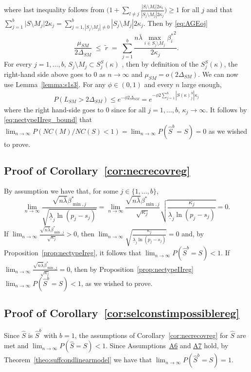 \documentclass[bj,authoryear]{imsart}
\theoremstyle{plain}
\begin{document}
where last inequality follows from $\Big(1+\sum_{l\neq j}\frac{|S_l\setminus M_l|2\kappa_l}{|S_j\setminus M_j|2\kappa_j}\Big)\geq 1$ for all $j$ and that $\sum_{j=1}^b \big|S\setminus M_j\big|2\kappa_j=\sum_{j=1,|S_j\setminus M_j|\neq 0 }^b|S_j\setminus M_j|2\kappa_j$. Then by \eqref{eq:AGEoj}
$$\frac{\mu_{SM}}{2\Delta_{SM}}\;\leq \;\tilde{r}\;=\;\sum_{j=1}^b\frac{n\bar{\lambda}\max_{i\in S_j\setminus M_j}{\beta_i^*}^2}{2\kappa_j}.$$
For every $j=1,\ldots,b$, $S_j\setminus M_j \subset S_j^{S}(\kappa)$ , then by definition of the $S_j^{S}(\kappa)$, the right-hand 
side above goes to 0 as $n \to \infty$ and  $\mu_{SM}=o(2\Delta_{SM})$. We can now use Lemma~\ref{lemma:s1s3}. %
For any $\phi \in (0,1)$ and every $n$ large enough,
\begin{align}
    P(L_{SM}> 2\Delta_{SM}) \leq e^{-\phi2\Delta_{SM}} = e^{-\phi2\sum_{j=1}^b|S(\kappa)_j^S|\kappa_j}
\nonumber
\end{align} 
where the right hand-side goes to 0 since for all $j=1,\ldots,b$, $\kappa_j \to \infty$. It follows by \eqref{eq:nectypeIIreg_bound} that $\lim_{n\to\infty}P\left( NC(M)/NC(S) < 1  \right)=\lim_{n\to\infty}P(\hat S^b=S)=0$ as we wished to prove.

\subsection{Proof of Corollary~\ref{cor:necrecovreg}}
By assumption we have that, for some $j\in\{1,\ldots,b\}$, 
$$\lim_{n\to\infty}\frac{\sqrt{n\bar{\lambda}}\beta_{\min,j}^*}{\sqrt{\underline{\lambda}_j\ln(p_j-s_j)}}= \lim_{n\to\infty}\frac{\sqrt{n\bar{\lambda}}\beta_{\min,j}^*}{\sqrt{\kappa_j}}\sqrt{\frac{\kappa_j}{\underline{\lambda}_j\ln(p_j-s_j)}} = 0.$$
If $\lim_{n\to\infty}\frac{\sqrt{n\bar{\lambda}}\beta_{\min,j}^*}{\sqrt{\kappa_j}}>0$, then $\lim_{n\to\infty}\sqrt{\frac{\kappa_j}{\underline{\lambda}_j\ln(p_j-s_j)}} = 0$ and, by Proposition~\ref{prop:nectypeIreg}, it follows that $\lim_{n \to \infty} P(\hat{S}^b=S) < 1$. 
If $\lim_{n\to\infty}\frac{\sqrt{n\bar{\lambda}}\beta_{\min,j}^*}{\sqrt{\kappa_j}}=0$, then by Proposition~\ref{prop:nectypeIIreg} $\lim_{n \to \infty} P(\hat{S}^b=S) < 1$, as we wished to prove.

\subsection{Proof of Corollary~\ref{cor:selconstimpossiblereg}}
Since $\hat{S}$ is $\hat{S}^b$ with $b=1$, the assumptions of Corollary~\ref{cor:necrecovreg} for $\hat{S}$ are met and $\lim_{n \to \infty} P(\hat{S} = S) < 1$. Since Assumptions~\hyperlink{lab:A6}{A6} and \hyperlink{lab:A7}{A7} hold, by Theorem~\ref{theo:suffcondlinearmodel} we have that $\lim_{n \to \infty} P(\hat{S}^b = S)= 1$.
\end{document}
